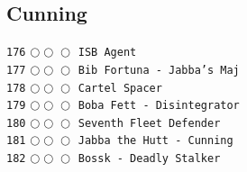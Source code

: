 \documentclass[a4paper,landscape]{article}
\begin{document}
\begin{multicols*}{5}
\section{Cunning} 
\vspace{-2mm} 
\texttt{176} \(\bigcirc\!\bigcirc\!\bigcirc\)  \texttt{ISB Agent} \vspace{-0.3mm}\\ 
\texttt{177} \(\bigcirc\!\bigcirc\!\bigcirc\)  \texttt{Bib Fortuna - Jabba's Maj} \vspace{-0.3mm}\\ 
\texttt{178} \(\bigcirc\!\bigcirc\!\bigcirc\)  \texttt{Cartel Spacer} \vspace{-0.3mm}\\ 
\texttt{179} \(\bigcirc\!\bigcirc\!\bigcirc\)  \texttt{Boba Fett - Disintegrator} \vspace{-0.3mm}\\ 
\texttt{180} \(\bigcirc\!\bigcirc\!\bigcirc\)  \texttt{Seventh Fleet Defender} \vspace{-0.3mm}\\ 
\texttt{181} \(\bigcirc\!\bigcirc\!\bigcirc\)  \texttt{Jabba the Hutt - Cunning } \vspace{-0.3mm}\\ 
\texttt{182} \(\bigcirc\!\bigcirc\!\bigcirc\)  \texttt{Bossk - Deadly Stalker} \vspace{-0.3mm}\\ 

\end{multicols*}
\end{document}
